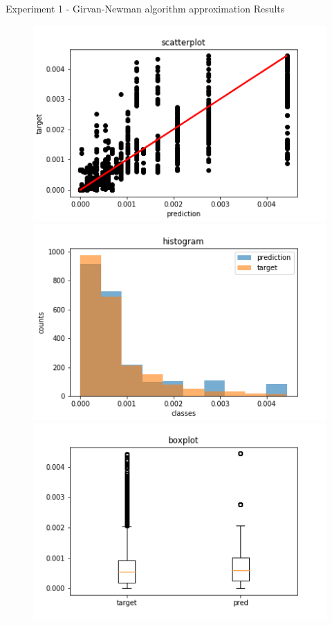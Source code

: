 \documentclass[xcolor=table]{beamer}
\begin{document}
\begin{frame}{Experiment 1 - Girvan-Newman algorithm approximation }{ Results}


\begin{figure}[H]
%
  \centering
    \includegraphics[width=0.9\linewidth]{img/GN_exp1/28bins/scatter_plot_20epochs.png}
\endminipage
{}%
  \centering
    \includegraphics[width=0.9\linewidth]{img/GN_exp1/28bins/histogram_20epochs.png}
\endminipage
{}%
  \centering
    \includegraphics[width=0.9\linewidth]{img/GN_exp1/28bins/boxplot_20epochs.png}
\endminipage
\end{figure}




\end{frame}
\end{document}
